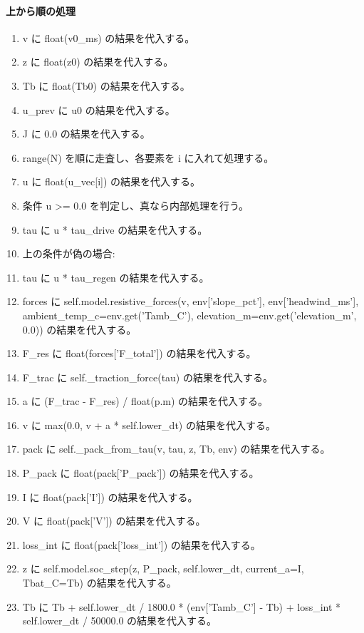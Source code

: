 \documentclass[a4paper,11pt]{article}
\begin{document}
            \paragraph{上から順の処理}
            \begin{enumerate}[leftmargin=1.8em]
            \item v に float(v0\_ms) の結果を代入する。
\item z に float(z0) の結果を代入する。
\item Tb に float(Tb0) の結果を代入する。
\item u\_prev に u0 の結果を代入する。
\item J に 0.0 の結果を代入する。
\item range(N) を順に走査し、各要素を i に入れて処理する。
\item   u に float(u\_vec[i]) の結果を代入する。
\item   条件 u >= 0.0 を判定し、真なら内部処理を行う。
\item     tau に u * tau\_drive の結果を代入する。
\item     上の条件が偽の場合:
\item     tau に u * tau\_regen の結果を代入する。
\item   forces に self.model.resistive\_forces(v, env['slope\_pct'], env['headwind\_ms'], ambient\_temp\_c=env.get('Tamb\_C'), elevation\_m=env.get('elevation\_m', 0.0)) の結果を代入する。
\item   F\_res に float(forces['F\_total']) の結果を代入する。
\item   F\_trac に self.\_traction\_force(tau) の結果を代入する。
\item   a に (F\_trac - F\_res) / float(p.m) の結果を代入する。
\item   v に max(0.0, v + a * self.lower\_dt) の結果を代入する。
\item   pack に self.\_pack\_from\_tau(v, tau, z, Tb, env) の結果を代入する。
\item   P\_pack に float(pack['P\_pack']) の結果を代入する。
\item   I に float(pack['I']) の結果を代入する。
\item   V に float(pack['V']) の結果を代入する。
\item   loss\_int に float(pack['loss\_int']) の結果を代入する。
\item   z に self.model.soc\_step(z, P\_pack, self.lower\_dt, current\_a=I, Tbat\_C=Tb) の結果を代入する。
\item   Tb に Tb + self.lower\_dt / 1800.0 * (env['Tamb\_C'] - Tb) + loss\_int * self.lower\_dt / 50000.0 の結果を代入する。

\end{enumerate}
\end{document}

